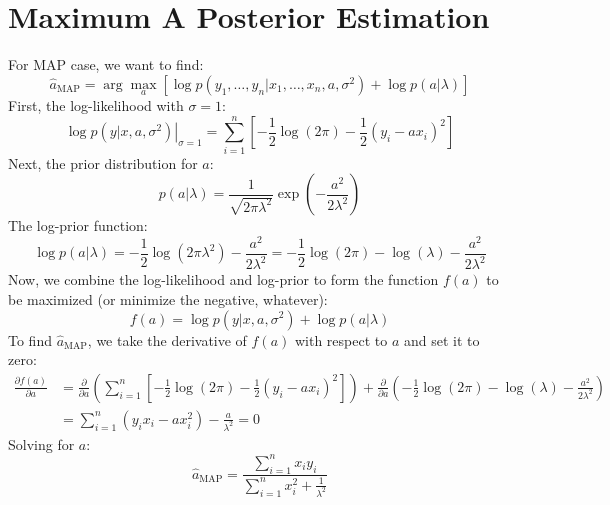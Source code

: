 \documentclass[11pt, a4paper, oneside]{memoir}
\begin{document}
\section{Maximum A Posterior Estimation}
For MAP case, we want to find:
\[ \hat{a}_{\text{MAP}} = \arg \max_a \left[ \log p(y_1, \dots, y_n | x_1, \dots, x_n, a, \sigma^2) + \log p(a | \lambda) \right] \]
First, the log-likelihood with $\sigma=1$:
\[ \left. \log p(y | x, a, \sigma^2) \right|_{\sigma=1} = \sum_{i=1}^n \left[ -\frac{1}{2} \log(2\pi) - \frac{1}{2} (y_i - ax_i)^2 \right] \]
Next, the prior distribution for $a$:
\[ p(a | \lambda) = \frac{1}{\sqrt{2\pi\lambda^2}} \exp\left( -\frac{a^2}{2\lambda^2} \right) \]
The log-prior function:
\[ \log p(a | \lambda) = -\frac{1}{2} \log(2\pi\lambda^2) - \frac{a^2}{2\lambda^2} = -\frac{1}{2} \log(2\pi) - \log(\lambda) - \frac{a^2}{2\lambda^2} \]
Now, we combine the log-likelihood and log-prior to form the function $f(a)$ to be maximized (or minimize the negative, whatever):
\[ f(a) = \log p(y | x, a, \sigma^2) + \log p(a | \lambda) \]
To find $\hat{a}_{\text{MAP}}$, we take the derivative of $f(a)$ with respect to $a$ and set it to zero:
\begin{align*}
    \frac{\partial f(a)}{\partial a} & = \frac{\partial}{\partial a} \left( \sum_{i=1}^n \left[ -\frac{1}{2} \log(2\pi) - \frac{1}{2} (y_i - ax_i)^2 \right] \right) + \frac{\partial}{\partial a} \left( -\frac{1}{2} \log(2\pi) - \log(\lambda) - \frac{a^2}{2\lambda^2} \right) \\
                                     & = \sum_{i=1}^n (y_i x_i - ax_i^2) - \frac{a}{\lambda^2} = 0
\end{align*}
Solving for $a$:
\[ \hat{a}_{\text{MAP}} = \frac{\sum_{i=1}^n x_i y_i}{\sum_{i=1}^n x_i^2 + \frac{1}{\lambda^2}} \]
\end{document}
